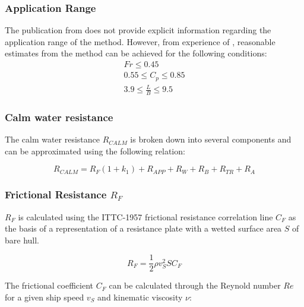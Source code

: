 \subsubsection*{Application Range}

The publication from  does not provide explicit information regarding the application range of the method. However, from experience of , reasonable estimates from the method can be achieved for the following conditions: \\

\begin{equation}
    \begin{gathered}
        Fr \leqslant 0.45 \\
        0.55 \leqslant C_p \leqslant 0.85 \\
        3.9 \leqslant \frac{L}{B} \leqslant 9.5
    \end{gathered}
\end{equation}

\subsubsection{Calm water resistance}\label{sec:Calm_Resistance}

The calm water resistance $R_{CALM}$ is broken down into several components and can be approximated using the following relation:

\begin{equation}\label{R_calm}
    R_{CALM} = R_F(1+k_1) + R_{APP} + R_W + R_B + R_{TR} + R_A
\end{equation}

\subsubsection*{Frictional Resistance $R_F$}

\textbf{$R_F$} is calculated using the ITTC-1957 frictional resistance correlation line $C_F$ as the basis of a representation of a resistance plate with a wetted surface area $S$ of bare hull. 

\begin{equation}\label{eqn:_R_f}
    R_F = \frac{1}{2}\rho v_{S}^2 S C_F 
\end{equation}

The frictional coefficient $C_F$ can be calculated through the Reynold number $Re$ for a given ship speed $v_{S}$ and kinematic viscosity $\nu$:

